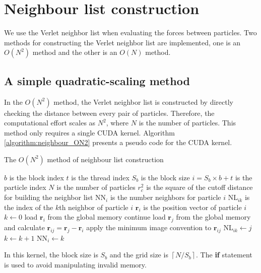 \documentclass[12pt,a4paper]{report}
\newcommand{\vect}[1]{\boldsymbol{#1}}
\begin{document}
\section{Neighbour list construction}


We use the Verlet neighbor list when evaluating the forces between particles. Two methods for constructing the Verlet neighbor list are implemented, one is an $O(N^2)$ method and the other is an $O(N)$ method.


\subsection{A simple quadratic-scaling method}

In the $O(N^2)$ method, the Verlet neighbor list is constructed by directly checking the distance between every pair of particles. Therefore, the computational effort scales as $N^2$, where $N$ is the number of particles. This method only requires a single CUDA kernel.
Algorithm \ref{algorithm:neighbour_ON2} presents a pseudo code for the CUDA kernel.

\begin{algorithm}[htb]
\caption{The $O(N^2)$ method of neighbour list construction }
\label{algorithm:neighbour_ON2}
\begin{algorithmic}[1]
\Require $b$ is the block index
\Require $t$ is the thread index
\Require $S_b$ is the block size
\Require $i=S_b\times b+t$ is the particle index
\Require $N$ is the number of particles
\Require $r_c^2$ is the square of the cutoff distance for building the neighbor list
\Require NN$_{i}$ is the number neighbors for particle $i$
\Require NL$_{ik}$ is the index of the $k$th neighbor of particle $i$
\Require $\vect{r}_{i}$ is the position vector of particle $i$
\State $k\leftarrow 0$
    \State load $\vect{r}_{i}$ from the global memory
            \State continue
        \EndIf
        \State load $\vect{r}_{j}$ from the global memory and calculate
               $\vect{r}_{ij} = \vect{r}_{j} - \vect{r}_{i}$
        \State apply the minimum image convention to $\vect{r}_{ij}$
        \If {$|\vect{r}_{ij}|^2 < r_c^2$}
            \State NL$_{ik}\leftarrow j$
            \State $k\leftarrow k+1$
        \EndIf
    \EndFor
    \State NN$_{i}\leftarrow k$
\EndIf
 \end{algorithmic}
\end{algorithm}

In this kernel, the block size is $S_b$ and the grid size is $\left \lceil {N/S_b} \right \rceil$. The \textbf{if} statement is used to avoid manipulating invalid memory.
\end{document}
